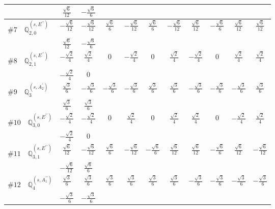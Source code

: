 \documentclass[fleqn,9pt,landscape]{jsarticle}
\begin{document}
\begin{center}
\begin{longtable}{lcccccccccc}
& $ \frac{\sqrt{6}}{12} $ & $ - \frac{\sqrt{6}}{6} $ & $  $ & $  $ & $  $ & $  $ & $  $ & $  $ & $  $ & $  $ \\ \hline
$ \#7\quad \mathbb{Q}_{2,0}^{(s,E^{\prime\prime})} $ & $ - \frac{\sqrt{6}}{12} $ & $ - \frac{\sqrt{6}}{12} $ & $ \frac{\sqrt{6}}{6} $ & $ - \frac{\sqrt{6}}{12} $ & $ \frac{\sqrt{6}}{6} $ & $ - \frac{\sqrt{6}}{12} $ & $ \frac{\sqrt{6}}{12} $ & $ - \frac{\sqrt{6}}{6} $ & $ \frac{\sqrt{6}}{12} $ & $ \frac{\sqrt{6}}{12} $ \\
& $ \frac{\sqrt{6}}{12} $ & $ - \frac{\sqrt{6}}{6} $ & $  $ & $  $ & $  $ & $  $ & $  $ & $  $ & $  $ & $  $ \\ \hline
$ \#8\quad \mathbb{Q}_{2,1}^{(s,E^{\prime\prime})} $ & $ - \frac{\sqrt{2}}{4} $ & $ \frac{\sqrt{2}}{4} $ & $ 0 $ & $ - \frac{\sqrt{2}}{4} $ & $ 0 $ & $ \frac{\sqrt{2}}{4} $ & $ - \frac{\sqrt{2}}{4} $ & $ 0 $ & $ \frac{\sqrt{2}}{4} $ & $ \frac{\sqrt{2}}{4} $ \\
& $ - \frac{\sqrt{2}}{4} $ & $ 0 $ & $  $ & $  $ & $  $ & $  $ & $  $ & $  $ & $  $ & $  $ \\ \hline
$ \#9\quad \mathbb{Q}_{3}^{(s,A_{2}^{\prime})} $ & $ \frac{\sqrt{3}}{6} $ & $ - \frac{\sqrt{3}}{6} $ & $ - \frac{\sqrt{3}}{6} $ & $ - \frac{\sqrt{3}}{6} $ & $ \frac{\sqrt{3}}{6} $ & $ \frac{\sqrt{3}}{6} $ & $ - \frac{\sqrt{3}}{6} $ & $ - \frac{\sqrt{3}}{6} $ & $ - \frac{\sqrt{3}}{6} $ & $ \frac{\sqrt{3}}{6} $ \\
& $ \frac{\sqrt{3}}{6} $ & $ \frac{\sqrt{3}}{6} $ & $  $ & $  $ & $  $ & $  $ & $  $ & $  $ & $  $ & $  $ \\ \hline
$ \#10\quad \mathbb{Q}_{3,0}^{(s,E^{\prime\prime})} $ & $ - \frac{\sqrt{2}}{4} $ & $ - \frac{\sqrt{2}}{4} $ & $ 0 $ & $ \frac{\sqrt{2}}{4} $ & $ 0 $ & $ \frac{\sqrt{2}}{4} $ & $ \frac{\sqrt{2}}{4} $ & $ 0 $ & $ - \frac{\sqrt{2}}{4} $ & $ \frac{\sqrt{2}}{4} $ \\
& $ - \frac{\sqrt{2}}{4} $ & $ 0 $ & $  $ & $  $ & $  $ & $  $ & $  $ & $  $ & $  $ & $  $ \\ \hline
$ \#11\quad \mathbb{Q}_{3,1}^{(s,E^{\prime\prime})} $ & $ \frac{\sqrt{6}}{12} $ & $ - \frac{\sqrt{6}}{12} $ & $ \frac{\sqrt{6}}{6} $ & $ - \frac{\sqrt{6}}{12} $ & $ - \frac{\sqrt{6}}{6} $ & $ \frac{\sqrt{6}}{12} $ & $ \frac{\sqrt{6}}{12} $ & $ - \frac{\sqrt{6}}{6} $ & $ \frac{\sqrt{6}}{12} $ & $ - \frac{\sqrt{6}}{12} $ \\
& $ - \frac{\sqrt{6}}{12} $ & $ \frac{\sqrt{6}}{6} $ & $  $ & $  $ & $  $ & $  $ & $  $ & $  $ & $  $ & $  $ \\ \hline
$ \#12\quad \mathbb{Q}_{4}^{(s,A_{1}^{\prime\prime})} $ & $ \frac{\sqrt{3}}{6} $ & $ \frac{\sqrt{3}}{6} $ & $ \frac{\sqrt{3}}{6} $ & $ \frac{\sqrt{3}}{6} $ & $ \frac{\sqrt{3}}{6} $ & $ \frac{\sqrt{3}}{6} $ & $ - \frac{\sqrt{3}}{6} $ & $ - \frac{\sqrt{3}}{6} $ & $ - \frac{\sqrt{3}}{6} $ & $ - \frac{\sqrt{3}}{6} $ \\
& $ - \frac{\sqrt{3}}{6} $ & $ - \frac{\sqrt{3}}{6} $ & $  $ & $  $ & $  $ & $  $ & $  $ & $  $ & $  $ & $  $ \\
\end{longtable}
\end{center}
\end{document}
